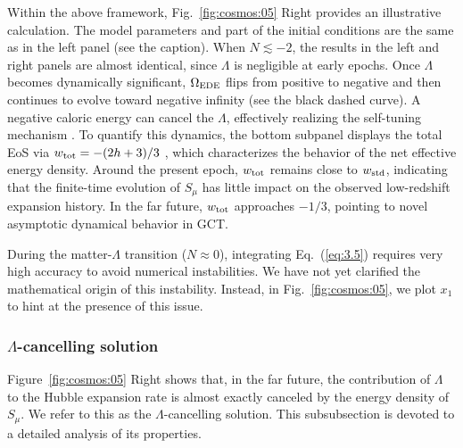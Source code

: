 \documentclass[aps,prd,twocolumn]{revtex4-2}
\newcommand\subEDE{{\rm EDE}}
\newcommand\substd{{\rm std}}
\newcommand\subtot{{\rm tot}}
\begin{document}
Within the above framework, Fig.~\ref{fig:cosmos:05} Right provides an illustrative calculation. The model parameters and part of the initial conditions are the same as in the left panel (see the caption). When $N\lesssim-2$, the results in the left and right panels are almost identical, since $\Lambda$ is negligible at early epochs. Once $\Lambda$ becomes dynamically significant, $\Omega_\subEDE$ flips from positive to negative and then continues to evolve toward negative infinity (see the black dashed curve). A negative caloric energy can cancel the $\Lambda$, effectively realizing the self-tuning mechanism \cite{Dolgov1985.JETPLett.41.345,Ford1987.PRD.35.2339,Charmousis2012.PRL.108.051101}. To quantify this dynamics, the bottom subpanel displays the total EoS via $w_\subtot=-(2h+3)/3$ \cite{Amendola2010.book}, which characterizes the behavior of the net effective energy density. Around the present epoch, $w_\subtot$ remains close to $w_\substd$, indicating that the finite-time evolution of $S_\mu$ has little impact on the observed low-redshift expansion history. In the far future, $w_\subtot$ approaches $-1/3$, pointing to novel asymptotic dynamical behavior in GCT.

During the matter-$\Lambda$ transition ($N\approx0$), integrating Eq.~(\ref{eq:3.5}) requires very high accuracy to avoid numerical instabilities. We have not yet clarified the mathematical origin of this instability. Instead, in Fig.~\ref{fig:cosmos:05}, we plot $x_1$ to hint at the presence of this issue.

\subsubsection{$\Lambda$-cancelling solution}
Figure~\ref{fig:cosmos:05} Right shows that, in the far future, the contribution of $\Lambda$ to the Hubble expansion rate is almost exactly canceled by the energy density of $S_\mu$. We refer to this as the $\Lambda$-cancelling solution. This subsubsection is devoted to a detailed analysis of its properties.
\end{document}
